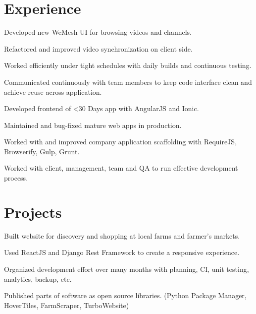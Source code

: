 \documentclass[]{deedy-resume-openfont}
\begin{document}
\hfill
\begin{minipage}[t]{0.66\textwidth} 


\section{Experience}

\vspace{\topsep} %
\begin{tightemize}
\item Developed new WeMesh UI for browsing videos and channels.
\item Refactored and improved video synchronization on client side.
\item Worked efficiently under tight schedules with daily builds and continuous testing.
\item Communicated continuously with team members to keep code interface clean and achieve reuse across application.
\end{tightemize}
\sectionsep

\begin{tightemize}
\item Developed frontend of <30 Days app with AngularJS and Ionic.
\item Maintained and bug-fixed mature web apps in production.
\item Worked with and improved company application scaffolding with RequireJS, Browserify, Gulp, Grunt.
\item Worked with client, management, team and QA to run effective development process.
\end{tightemize}
\sectionsep


\section{Projects}
\begin{tightemize}
\item Built website for discovery and shopping at local farms and farmer's markets.
\item Used ReactJS and Django Rest Framework to create a responsive experience.
\item Organized development effort over many months with planning, CI, unit testing, analytics, backup, etc.
\item Published parts of software as open source libraries. (Python Package Manager, HoverTiles, FarmScraper, TurboWebsite)
\end{tightemize}
\sectionsep


\end{minipage}
\end{document}
